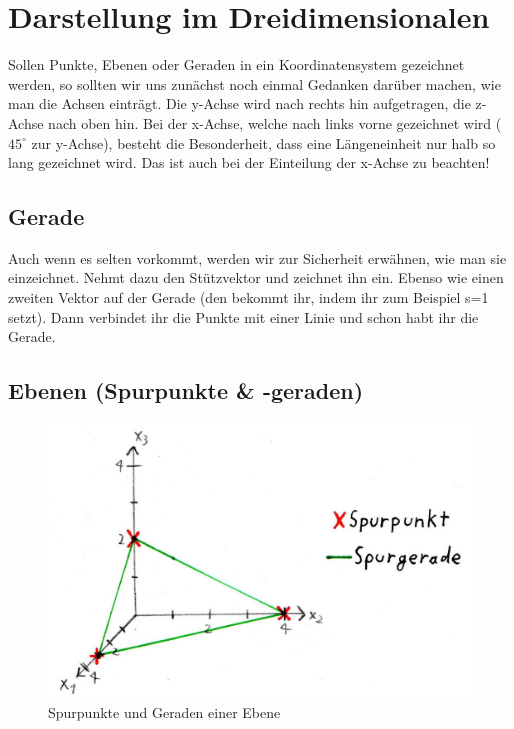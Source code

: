 \section{Darstellung im Dreidimensionalen}
	Sollen Punkte, Ebenen oder Geraden in ein Koordinatensystem gezeichnet werden,
	so sollten wir uns zunächst noch einmal Gedanken darüber machen, wie man die
	Achsen einträgt. Die y-Achse wird nach rechts hin aufgetragen, die z-Achse nach
	oben hin. Bei der x-Achse, welche nach links vorne gezeichnet wird
	(\(45^{\circ}\) zur y-Achse), besteht die Besonderheit, dass eine Längeneinheit
	nur halb so lang gezeichnet wird. Das ist auch bei der Einteilung der x-Achse
	zu beachten!

	\subsection{Gerade}
		Auch wenn es selten vorkommt, werden wir zur Sicherheit erwähnen, wie man sie
		einzeichnet. Nehmt dazu den Stützvektor und zeichnet ihn ein. Ebenso wie einen
		zweiten Vektor auf der Gerade (den bekommt ihr, indem ihr zum Beispiel s=1
		setzt). Dann verbindet ihr die Punkte mit einer Linie und schon habt ihr die
		Gerade.

	\subsection{Ebenen (Spurpunkte \& -geraden)}

    	\begin{figure}[h]
    		\centering
    		\includegraphics[scale=0.2]{Images/Spurpunkte.jpeg}
    		\caption{Spurpunkte und Geraden einer Ebene}
    	\end{figure}

